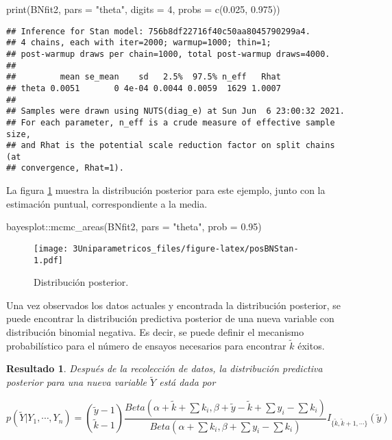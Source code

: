 \documentclass[
  10pt,
  spanish,
]{book}
\newenvironment{Shaded}{\begin{snugshade}}{\end{snugshade}}
\newcommand{\AttributeTok}[1]{\textcolor[rgb]{0.77,0.63,0.00}{#1}}
\newcommand{\DecValTok}[1]{\textcolor[rgb]{0.00,0.00,0.81}{#1}}
\newcommand{\FloatTok}[1]{\textcolor[rgb]{0.00,0.00,0.81}{#1}}
\newcommand{\FunctionTok}[1]{\textcolor[rgb]{0.00,0.00,0.00}{#1}}
\newcommand{\NormalTok}[1]{#1}
\newcommand{\SpecialCharTok}[1]{\textcolor[rgb]{0.00,0.00,0.00}{#1}}
\newcommand{\StringTok}[1]{\textcolor[rgb]{0.31,0.60,0.02}{#1}}
\newtheorem{proposition}{Resultado}[chapter]
\theoremstyle{definition}
\theoremstyle{definition}
\theoremstyle{definition}
\theoremstyle{definition}
\theoremstyle{remark}
\begin{document}
\begin{Shaded}
\begin{Highlighting}[]
\FunctionTok{print}\NormalTok{(BNfit2, }\AttributeTok{pars =} \StringTok{"theta"}\NormalTok{, }
      \AttributeTok{digits =} \DecValTok{4}\NormalTok{, }\AttributeTok{probs =} \FunctionTok{c}\NormalTok{(}\FloatTok{0.025}\NormalTok{, }\FloatTok{0.975}\NormalTok{))}
\end{Highlighting}
\end{Shaded}

\begin{verbatim}
## Inference for Stan model: 756b8df22716f40c50aa8045790299a4.
## 4 chains, each with iter=2000; warmup=1000; thin=1; 
## post-warmup draws per chain=1000, total post-warmup draws=4000.
## 
##         mean se_mean    sd   2.5%  97.5% n_eff   Rhat
## theta 0.0051       0 4e-04 0.0044 0.0059  1629 1.0007
## 
## Samples were drawn using NUTS(diag_e) at Sun Jun  6 23:00:32 2021.
## For each parameter, n_eff is a crude measure of effective sample size,
## and Rhat is the potential scale reduction factor on split chains (at 
## convergence, Rhat=1).
\end{verbatim}

La figura \ref{fig:posBNStan} muestra la distribución posterior para este ejemplo, junto con la estimación puntual, correspondiente a la media.

\begin{Shaded}
\begin{Highlighting}[]
\NormalTok{bayesplot}\SpecialCharTok{::}\FunctionTok{mcmc\_areas}\NormalTok{(BNfit2, }\AttributeTok{pars =} \StringTok{"theta"}\NormalTok{, }
                      \AttributeTok{prob =} \FloatTok{0.95}\NormalTok{)}
\end{Highlighting}
\end{Shaded}

\begin{figure}
\centering
\texttt{[image: 3Uniparametricos\_files/figure-latex/posBNStan-1.pdf]}
\caption{\label{fig:posBNStan}Distribución posterior.}
\end{figure}

Una vez observados los datos actuales y encontrada la distribución posterior, se puede encontrar la distribución predictiva posterior de una nueva variable con distribución binomial negativa. Es decir, se puede definir el mecanismo probabilístico para el número de ensayos necesarios para encontrar \(\tilde{k}\) éxitos.

\begin{proposition}
\protect\hypertarget{prp:unnamed-chunk-39}{}{\label{prp:unnamed-chunk-39} }Después de la recolección de datos, la distribución predictiva posterior para una nueva variable \(\tilde{Y}\) está dada por

\begin{equation*}
p(\tilde{Y}|Y_1,\cdots,Y_n)=\binom{\tilde{y}-1}{\tilde{k}-1}\frac{Beta(\alpha+\tilde{k}+\sum k_i,\beta+\tilde{y}-\tilde{k}+\sum y_i-\sum k_i)}{Beta(\alpha+\sum k_i,\beta+\sum y_i-\sum k_i)}I_{\{\tilde{k},\tilde{k}+1,\cdots\}}(\tilde{y})
\end{equation*}
\end{proposition}
\end{document}
